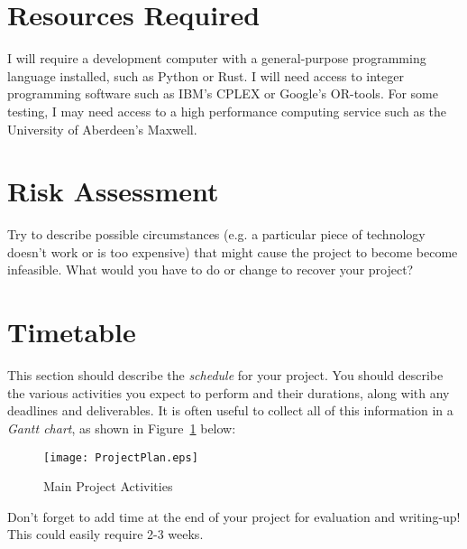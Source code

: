 \documentclass[a4paper,12pt]{article}
\begin{document}
\section*{Resources Required}

I will require a development computer with a general-purpose programming
language installed, such as Python or Rust. I will need access to integer
programming software such as IBM's CPLEX or Google's OR-tools. For some
testing, I may need access to a high performance computing service such
as the University of Aberdeen's Maxwell.



\section*{Risk Assessment}

Try to describe possible circumstances (e.g. a particular piece of
technology doesn't work or is too expensive) that might cause
the project to become become infeasible. What would you have to do
or change to recover your project?

\section*{Timetable}

This section should describe the {\em schedule} for your project. 
You should describe the various activities you expect to perform
and their durations, along with any deadlines and deliverables.
It is often useful to collect all of this information in a
{\em Gantt chart}, as shown in Figure~\ref{fig:plan} below:

\begin{figure}[htb]
\begin{center}
\texttt{[image: ProjectPlan.eps]}
\caption{Main Project Activities\label{fig:plan}}
\end{center}
\end{figure}


Don't forget to add time at the end of your project for 
evaluation and writing-up! This could easily require 2-3 weeks.



\end{document}
